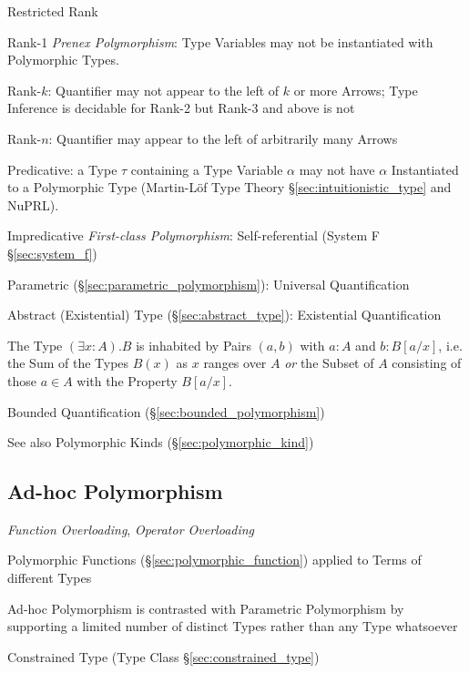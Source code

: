 \asterism


Restricted Rank

Rank-1 \emph{Prenex Polymorphism}: Type Variables may not be
instantiated with Polymorphic Types.

Rank-$k$: Quantifier may not appear to the left of $k$ or more Arrows;
Type Inference is decidable for Rank-2 but Rank-3 and above is not

Rank-$n$: Quantifier may appear to the left of arbitrarily many Arrows

Predicative: a Type $\tau$ containing a Type Variable $\alpha$ may not
have $\alpha$ Instantiated to a Polymorphic Type (Martin-L\"of Type
Theory \S\ref{sec:intuitionistic_type} and NuPRL).

Impredicative \emph{First-class Polymorphism}: Self-referential
(System F \S\ref{sec:system_f})

Parametric (\S\ref{sec:parametric_polymorphism}): Universal
Quantification

Abstract (Existential) Type (\S\ref{sec:abstract_type}): Existential
Quantification

The Type $(\exists x : A).B$ is inhabited by Pairs $(a,b)$ with $a:A$
and $b:B[a/x]$, i.e. the Sum of the Types $B(x)$ as $x$ ranges over
$A$ \emph{or} the Subset of $A$ consisting of those $a \in A$ with the
Property $B[a/x]$.

Bounded Quantification (\S\ref{sec:bounded_polymorphism})

\fist See also Polymorphic Kinds (\S\ref{sec:polymorphic_kind})



\subsection{Ad-hoc Polymorphism}\label{sec:adhoc_polymorphism}

\emph{Function Overloading}, \emph{Operator Overloading}

Polymorphic Functions (\S\ref{sec:polymorphic_function}) applied to
Terms of different Types

Ad-hoc Polymorphism is contrasted with Parametric Polymorphism by
supporting a limited number of distinct Types rather than any Type
whatsoever

Constrained Type (Type Class \S\ref{sec:constrained_type})



